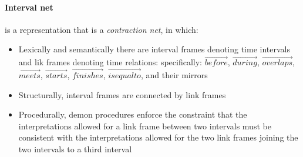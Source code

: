 \documentclass{article}
\begin{document}
\paragraph{Interval net} is a representation that is a
\textit{contraction net}, in which:
\begin{itemize}
  \item Lexically and semantically there are interval frames
    denoting time intervals and lik frames denoting time
    relations: specifically: $\overrightarrow{before}$,
    $\overrightarrow{during}$, $\overrightarrow{overlaps}$,
    $\overrightarrow{meets}$, $\overrightarrow{starts}$,
    $\overrightarrow{finishes}$, $\overrightarrow{is equal to}$,
    and their mirrors
  \item Structurally, interval frames are connected by link
    frames
  \item Procedurally, demon procedures enforce the constraint
    that the interpretations allowed for a link frame between two
    intervals must be consistent with the interpretations allowed
    for the two link frames joining the two intervals to a third
    interval
\end{itemize}
\end{document}
